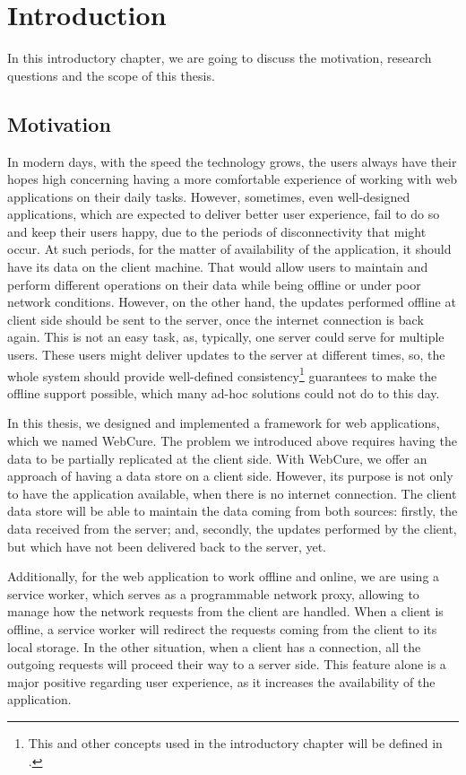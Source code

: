 \chapter{Introduction}
\label{Introduction}

In this introductory chapter, we are going to discuss the motivation, research questions and the scope of this thesis.

\section{Motivation}
\label{Introduction-Motivation}

In modern days, with the speed the technology grows, the users always have their hopes high concerning having a more comfortable experience of working with web applications on their daily tasks. However, sometimes, even well-designed applications, which are expected to deliver better user experience, fail to do so and keep their users happy, due to the periods of disconnectivity that might occur. At such periods, for the matter of availability of the application, it should have its data on the client machine. That would allow users to maintain and perform different operations on their data while being offline or under poor network conditions. However, on the other hand, the updates performed offline at client side should be sent to the server, once the internet connection is back again. This is not an easy task, as, typically, one server could serve for multiple users. These users might deliver updates to the server at different times, so, the whole system should provide well-defined consistency\footnote{This and other concepts used in the introductory chapter will be defined in .} guarantees to make the offline support possible, which many ad-hoc solutions could not do to this day.

In this thesis, we designed and implemented a framework for web applications, which we named WebCure. The problem we introduced above requires having the data to be partially replicated at the client side. With WebCure, we offer an approach of having a data store on a client side. However, its purpose is not only to have the application available, when there is no internet connection. The client data store will be able to maintain the data coming from both sources: firstly, the data received from the server; and, secondly, the updates performed by the client, but which have not been delivered back to the server, yet. 

Additionally, for the web application to work offline and online, we are using a service worker, which serves as a programmable network proxy, allowing to manage how the network requests from the client are handled. When a client is offline, a service worker will redirect the requests coming from the client to its local storage. In the other situation, when a client has a connection, all the outgoing requests will proceed their way to a server side. This feature alone is a major positive regarding user experience, as it increases the availability of the application. 

